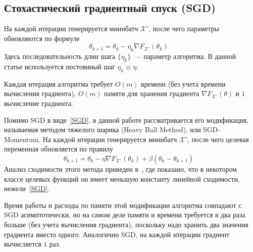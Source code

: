 \documentclass[preprint,12pt]{elsarticle}
\begin{document}
{\subsection{Стохастический градиентный спуск (SGD)}\label{SS:2.1}
На каждой итерации генерируется минибатч $\mathcal{X}'$, после чего параметры обновляются по формуле
\begin{equation}\label{SGD}
    \theta_{k+1} = \theta_k - \eta_k \nabla F_{\mathcal{X}'} (\theta_k)
\end{equation}
Здесь последовательность длин шага $\{\eta_k\}$~--- параметр алгоритма. В данной статье используется постоянный шаг $\eta_k \equiv \eta$.

Каждая итерация алгоритма требует $O(m)$ времени (без учета времени вычисления градиента), $O(m)$ памяти для хранения градиента $\nabla F_{\mathcal{X}'}(\theta)$ и $1$ вычисление градиента.

Помимо SGD в виде~\ref{SGD}, в данной работе рассматривается его модификация, называемая методом тяжелого шарика (Heavy Ball Method), или SGD-Momentum. 
На каждой итерации генерируется минибатч $\mathcal{X}'$, после чего целевая переменная обновляется по правилу
\begin{equation}\label{HB}
    \theta_{k+1} = \theta_k - \eta \nabla F_{\mathcal{X}'}(\theta_k) + \beta (\theta_k - \theta_{k+1})
\end{equation}
Анализ сходимости этого метода приведен в~\cite{HBconvergence}, где показано, что в некотором классе целевых функций он имеет меньшую константу линейной сходимости, нежели~\ref{SGD}.

Время работы и расходы по памяти этой модификации алгоритма совпадают с SGD асимптотически, но на самом деле памяти и времени требуется в два раза больше (без учета вычисления градиента), поскольку надо хранить два значения градиента вместо одного. Аналогично SGD, на каждой итерации градиент вычисляется $1$ раз.

}
\end{document}
